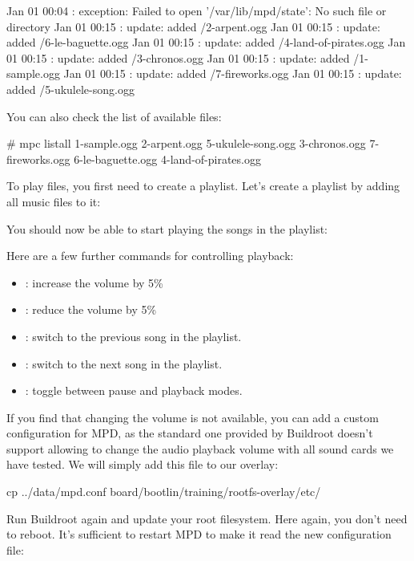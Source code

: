 \begin{terminaloutput}
Jan 01 00:04 : exception: Failed to open '/var/lib/mpd/state': No such file or directory
Jan 01 00:15 : update: added /2-arpent.ogg
Jan 01 00:15 : update: added /6-le-baguette.ogg
Jan 01 00:15 : update: added /4-land-of-pirates.ogg
Jan 01 00:15 : update: added /3-chronos.ogg
Jan 01 00:15 : update: added /1-sample.ogg
Jan 01 00:15 : update: added /7-fireworks.ogg
Jan 01 00:15 : update: added /5-ukulele-song.ogg
\end{terminaloutput}

You can also check the list of available files:
\begin{terminaloutput}
# mpc listall
1-sample.ogg
2-arpent.ogg
5-ukulele-song.ogg
3-chronos.ogg
7-fireworks.ogg
6-le-baguette.ogg
4-land-of-pirates.ogg
\end{terminaloutput}

To play files, you first need to create a playlist. Let's create a
playlist by adding all music files to it:


You should now be able to start playing the songs in the playlist:


Here are a few further commands for controlling playback:
\begin{itemize}
\item {}: increase the volume by 5\%
\item {}: reduce the volume by 5\%
\item {}: switch to the previous song in the playlist.
\item {}: switch to the next song in the playlist.
\item {}: toggle between pause and playback modes.
\end{itemize}

If you find that changing the volume is not available, you can
add a custom configuration for MPD, as the standard one
provided by Buildroot doesn't support allowing to change the audio
playback volume with all sound cards we have tested. We will simply
add this file to our overlay:

\begin{bashinput}
cp ../data/mpd.conf board/bootlin/training/rootfs-overlay/etc/
\end{bashinput}

Run Buildroot again and update your root filesystem. Here again, you
don't need to reboot. It's sufficient to restart MPD to make it read
the new configuration file:

